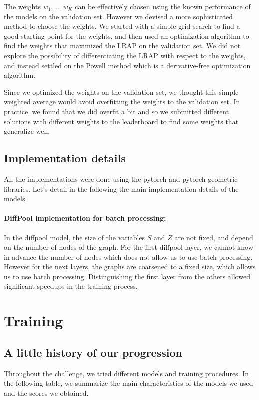 \documentclass[switch, 11pt]{article}
\begin{document}
\begin{multicols}{2}
    The weights $w_1,\dots,w_K$ can be effectively chosen using the known performance of the models on the validation set. However we devised a more sophisticated method to choose the weights. We started with a simple grid search to find a good starting point for the weights, and then used an optimization algorithm to find the weights that maximized the LRAP on the validation set. We did not explore the possibility of differentiating the LRAP with respect to the weights, and instead settled on the Powell method \cite{powell-1964} which is a derivative-free optimization algorithm.

    Since we optimized the weights on the validation set, we thought this simple weighted average would avoid overfitting the weights to the validation set. In practice, we found that we did overfit a bit and so we submitted different solutions with different weights to the leaderboard to find some weights that generalize well.

    \subsection{Implementation details}

    All the implementations were done using the pytorch and pytorch-geometric libraries. Let's detail in the following the main implementation details of the models.
    \paragraph*{DiffPool implementation for batch processing: } In the diffpool model, the size of the variables $S$ and $Z$ are not fixed, and depend on the number of nodes of the graph. For the first diffpool layer, we cannot know in advance the number of nodes which does not allow us to use batch processing. However for the next layers, the graphs are coarsened to a fixed size, which allows us to use batch processing. Distinguishing the first layer from the others allowed significant speedups in the training process.



    \section{Training}

    \subsection{A little history of our progression}
    Throughout the challenge, we tried different models and training procedures. In the following table, we summarize the main characteristics of the models we used and the scores we obtained.


\end{multicols}
\end{document}
